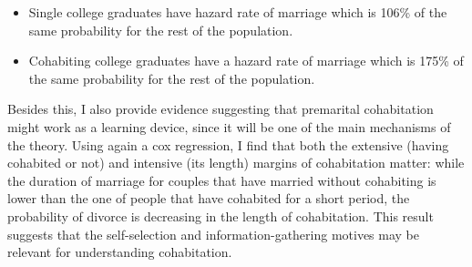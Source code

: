 \documentclass[12pt]{article}
\begin{document}
{\begin{itemize}
\item  Single college graduates have hazard rate of marriage which is 106\% of the same probability for the rest of the population.
\item Cohabiting college graduates have a hazard rate of marriage which is 175\% of the same probability for the rest of the population. 
\end{itemize}
 Besides this, I also provide evidence suggesting that premarital cohabitation might work as a learning device, since it will be one of the main mechanisms of the theory. Using again a cox regression, I find that both the extensive (having cohabited or not) and intensive (its length) margins of cohabitation matter: while the duration of marriage for couples that have married without cohabiting is lower than the one of people that have cohabited for a short period, the probability of divorce is decreasing in the length of cohabitation. This result suggests that the self-selection and information-gathering motives may be relevant for understanding cohabitation.
  
}
\end{document}
